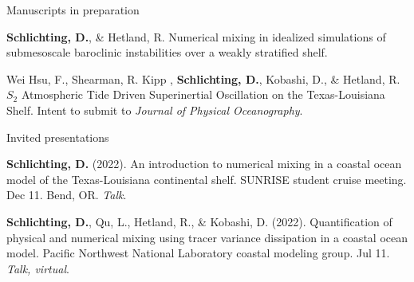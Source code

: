 \documentclass{resume} %
\begin{document}
\begin{rSection}{Manuscripts in preparation}
\vspace{-3pt}
\begin{etaremune}
\item \textbf{Schlichting, D.}, \& Hetland, R. Numerical mixing in idealized simulations of submesoscale baroclinic instabilities over a weakly stratified shelf.
\item Wei Hsu, F., Shearman, R. Kipp , \textbf{Schlichting, D.}, Kobashi, D., \& Hetland, R. $S_2$ Atmospheric Tide Driven Superinertial Oscillation on the Texas-Louisiana Shelf. Intent to submit to \textit{Journal of Physical Oceanography}.
\end{etaremune}
\end{rSection}

\begin{rSection}{Invited presentations}
\vspace{-3pt}

\begin{etaremune}
    \item \textbf{Schlichting, D.} (2022). An introduction to numerical mixing in a coastal ocean model of the Texas-Louisiana continental shelf. SUNRISE student cruise meeting. Dec 11. Bend, OR. \textit{Talk}.
    \item \textbf{Schlichting, D.}, Qu, L., Hetland, R., \& Kobashi, D. (2022). Quantification of physical and numerical mixing using tracer variance dissipation in a coastal ocean model. Pacific Northwest National Laboratory coastal modeling group. Jul 11. \textit{Talk, virtual}.
\end{etaremune}
\end{rSection}
\end{document}

